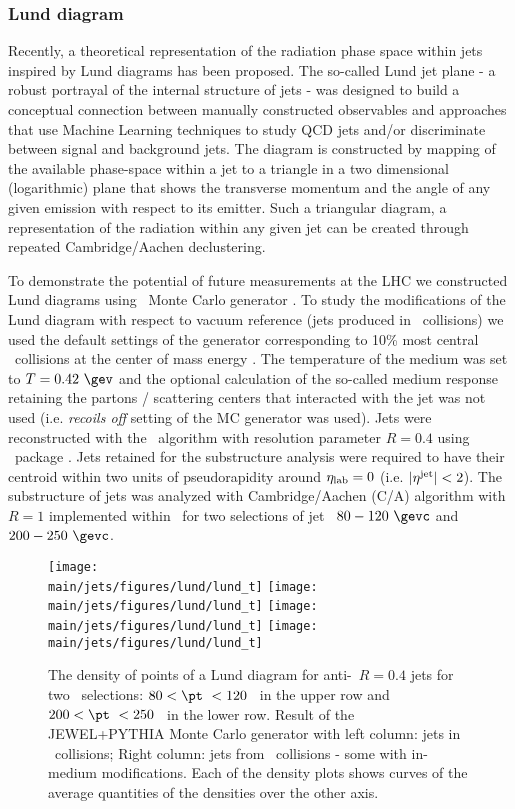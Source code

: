 \newpage
\subsubsection{Lund diagram}

Recently, a theoretical representation of the radiation phase space within jets inspired by Lund diagrams \cite{Andersson:1988gp} has been proposed. The so-called Lund jet plane \cite{Dreyer:2018nbf} - a robust portrayal of the internal structure of jets - was designed to build a conceptual connection between manually constructed observables and approaches that use Machine Learning techniques to study QCD jets and/or discriminate between signal and background jets.
The diagram is constructed by mapping of the available phase-space within a jet to a triangle in a two dimensional (logarithmic) plane that shows the transverse momentum and the angle of any given emission with respect to its emitter.
Such a triangular diagram, a representation of the radiation within any given jet can be created through repeated Cambridge/Aachen declustering.

To demonstrate the potential of future measurements at the LHC we constructed Lund diagrams using \jewel\ Monte Carlo generator \cite{Zapp:2013vla}.
To study the modifications of the Lund diagram with respect to vacuum reference (jets produced in \pp\ collisions) we used the default settings of the generator corresponding to 10\% most central \PbPb\ collisions at the center of mass energy .
The temperature of the medium was set to $T=0.42~\gev$ and the optional calculation of the so-called medium response retaining the partons / scattering centers that interacted with the jet was not used (i.e. {\it recoils off} setting of the MC generator was used).
Jets were reconstructed with the \akt\ algorithm \cite{Cacciari:2008gp} with resolution parameter $R=0.4$ using \fastjet\ package \cite{Cacciari:2011ma,Cacciari:2005hq}.
Jets retained for the substructure analysis were required to have their centroid within two units of pseudorapidity around $\eta_{\rm lab}=0$ (i.e. $|\eta^{\rm jet}| < 2$).
The substructure of jets was analyzed with Cambridge/Aachen (C/A) algorithm with $R=1$ implemented within \fastjet\ for two selections of jet \pt\ $80-120~\gevc$ and $200-250~\gevc$.

\begin{figure}[htbp]
	\centering
	\texttt{[image: \\main/jets/figures/lund/lund\_t]}
	\texttt{[image: \\main/jets/figures/lund/lund\_t]}
	\texttt{[image: \\main/jets/figures/lund/lund\_t]}
	\texttt{[image: \\main/jets/figures/lund/lund\_t]}
	\caption{The density of points of a Lund diagram for anti-\kT\ $R=0.4$ jets for two \pt\ selections: $80 < \pt\ < 120$ \gevc\ in the upper row and $200 < \pt\ < 250$ \gevc\ in the lower row. Result of the JEWEL+PYTHIA Monte Carlo generator with left column: jets in \pp\ collisions; Right column: jets from \PbPb\ collisions - some with in-medium modifications. Each of the density plots shows curves of the average quantities of the densities over the other axis.}
	\label{fig:Lund_jets}
\end{figure}

